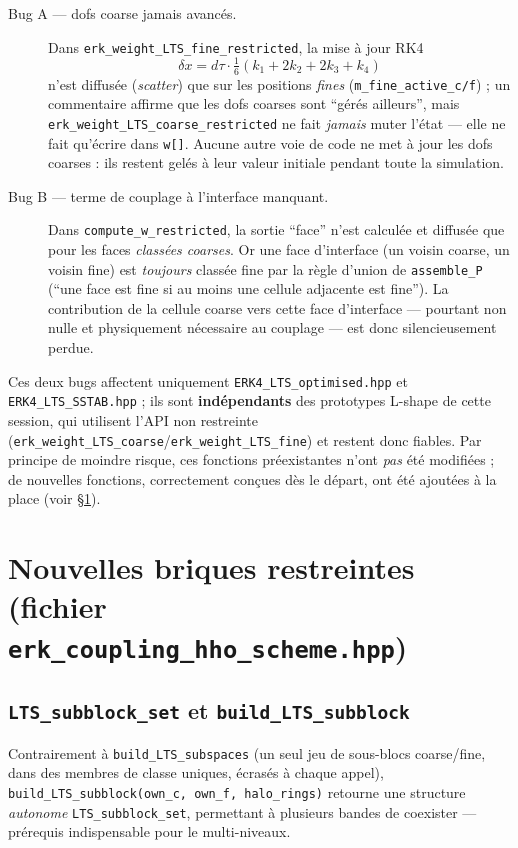 \documentclass[11pt]{article}
\newcommand{\code}[1]{\texttt{#1}}
\begin{document}
\begin{description}
  \item[Bug A --- dofs coarse jamais avancés.] Dans
  \code{erk\_weight\_LTS\_fine\_restricted}, la mise à jour RK4
  \[
    \delta x = d\tau \cdot \tfrac{1}{6}(k_1+2k_2+2k_3+k_4)
  \]
  n'est diffusée (\emph{scatter}) que sur les positions \emph{fines}
  (\code{m\_fine\_active\_c/f}) ; un commentaire affirme que les dofs
  coarses sont ``gérés ailleurs'', mais
  \code{erk\_weight\_LTS\_coarse\_restricted} ne fait \emph{jamais} muter
  l'état --- elle ne fait qu'écrire dans \code{w[]}. Aucune autre voie
  de code ne met à jour les dofs coarses : ils restent gelés à leur valeur
  initiale pendant toute la simulation.
  \item[Bug B --- terme de couplage à l'interface manquant.] Dans
  \code{compute\_w\_restricted}, la sortie ``face'' n'est calculée et
  diffusée que pour les faces \emph{classées coarses}. Or une face
  d'interface (un voisin coarse, un voisin fine) est \emph{toujours}
  classée fine par la règle d'union de \code{assemble\_P} (``une face est
  fine si au moins une cellule adjacente est fine''). La contribution de la
  cellule coarse vers cette face d'interface --- pourtant non nulle et
  physiquement nécessaire au couplage --- est donc silencieusement
  perdue.
\end{description}

Ces deux bugs affectent uniquement \code{ERK4\_LTS\_optimised.hpp} et
\code{ERK4\_LTS\_SSTAB.hpp} ; ils sont \textbf{indépendants} des
prototypes L-shape de cette session, qui utilisent l'API non restreinte
(\code{erk\_weight\_LTS\_coarse}/\code{erk\_weight\_LTS\_fine}) et restent
donc fiables. Par principe de moindre risque, ces fonctions préexistantes
n'ont \emph{pas} été modifiées ; de nouvelles fonctions, correctement
conçues dès le départ, ont été ajoutées à la place (voir \S\ref{sec:v2}).

\section{Nouvelles briques restreintes (fichier \code{erk\_coupling\_hho\_scheme.hpp})}
\label{sec:v2}

\subsection{\code{LTS\_subblock\_set} et \code{build\_LTS\_subblock}}

Contrairement à \code{build\_LTS\_subspaces} (un seul jeu de sous-blocs
coarse/fine, dans des membres de classe uniques, écrasés à chaque appel),
\code{build\_LTS\_subblock(own\_c, own\_f, halo\_rings)} retourne une
structure \emph{autonome} \code{LTS\_subblock\_set}, permettant à
plusieurs bandes de coexister --- prérequis indispensable pour le
multi-niveaux.
\end{document}
